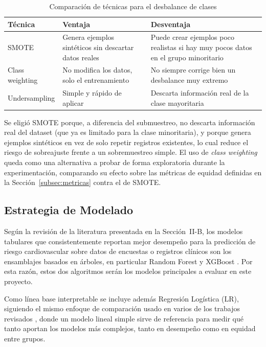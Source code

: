\documentclass[conference]{IEEEtran}
\begin{document}
\begin{table}[h]
\centering
\caption{Comparación de técnicas para el desbalance de clases}
\label{tab:balanceo}
\small
\renewcommand{\arraystretch}{1.2}
\begin{tabular}{@{}p{2.0cm}p{2.5cm}p{2.5cm}@{}}
\toprule
\textbf{Técnica} & \textbf{Ventaja} & \textbf{Desventaja} \\
\midrule
SMOTE & Genera ejemplos sintéticos sin descartar datos reales & Puede crear ejemplos poco realistas si hay muy pocos datos en el grupo minoritario \\
Class weight\-ing & No modifica los datos, solo el entrenamiento & No siempre corrige bien un desbalance muy extremo \\
Under\-samp\-ling & Simple y rápido de aplicar & Descarta información real de la clase mayoritaria \\
\bottomrule
\end{tabular}
\end{table}

Se eligió SMOTE porque, a diferencia del submuestreo, no descarta información real del dataset (que ya es limitado para la clase minoritaria), y porque genera ejemplos sintéticos en vez de solo repetir registros existentes, lo cual reduce el riesgo de sobreajuste frente a un sobremuestreo simple. El uso de \textit{class weighting} queda como una alternativa a probar de forma exploratoria durante la experimentación, comparando su efecto sobre las métricas de equidad definidas en la Sección~\ref{subsec:metricas} contra el de SMOTE.

\subsection{Estrategia de Modelado}

Según la revisión de la literatura presentada en la Sección~II-B, los modelos tabulares que consistentemente reportan mejor desempeño para la predicción de riesgo cardiovascular sobre datos de encuestas o registros clínicos son los ensamblajes basados en árboles, en particular Random Forest y XGBoost \cite{li2023evaluating, davoudi2024fairness, lee2025evaluating}. Por esta razón, estos dos algoritmos serán los modelos principales a evaluar en este proyecto.

Como línea base interpretable se incluye además Regresión Logística (LR), siguiendo el mismo enfoque de comparación usado en varios de los trabajos revisados \cite{foryciarz2022evaluating, pfohl2021empirical, pfohl2022comparison}, donde un modelo lineal simple sirve de referencia para medir qué tanto aportan los modelos más complejos, tanto en desempeño como en equidad entre grupos.
\end{document}
